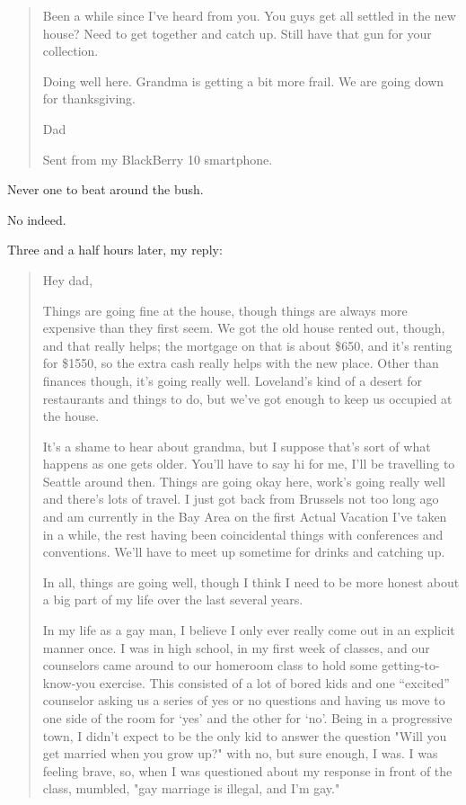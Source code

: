\begin{paracol}{2}
\begin{leftcolumn}
\begin{quotation}
Been a while since I've heard from you. You guys get all settled in the new house? Need to get together and catch up. Still have that gun for your collection.

Doing well here. Grandma is getting a bit more frail. We are going down for thanksgiving.

Dad

Sent from my BlackBerry 10 smartphone.
\end{quotation}

\begin{ally}
Never one to beat around the bush.
\end{ally}
No indeed.

Three and a half hours later, my reply:

\begin{quotation}
\noindent Hey dad,

Things are going fine at the house, though things are always more expensive than they first seem.  We got the old house rented out, though, and that really helps; the mortgage on that is about \$650, and it's renting for \$1550, so the extra cash really helps with the new place.  Other than finances though, it's going really well.  Loveland's kind of a desert for restaurants and things to do, but we've got enough to keep us occupied at the house.

It's a shame to hear about grandma, but I suppose that's sort of what happens as one gets older.  You'll have to say hi for me, I'll be travelling to Seattle around then.  Things are going okay here, work's going really well and there's lots of travel.  I just got back from Brussels not too long ago and am currently in the Bay Area on the first Actual Vacation I've taken in a while, the rest having been coincidental things with conferences and conventions.  We'll have to meet up sometime for drinks and catching up.

In all, things are going well, though I think I need to be more honest about a big part of my life over the last several years.

In my life as a gay man, I believe I only ever really come out in an explicit manner once.  I was in high school, in my first week of classes, and our counselors came around to our homeroom class to hold some getting-to-know-you exercise.  This consisted of a lot of bored kids and one ``excited'' counselor asking us a series of yes or no questions and having us move to one side of the room for `yes' and the other for `no'.  Being in a progressive town, I didn't expect to be the only kid to answer the question "Will you get married when you grow up?" with no, but sure enough, I was.  I was feeling brave, so, when I was questioned about my response in front of the class, mumbled, "gay marriage is illegal, and I'm gay."


\end{quotation}
\end{leftcolumn}
\end{paracol}
